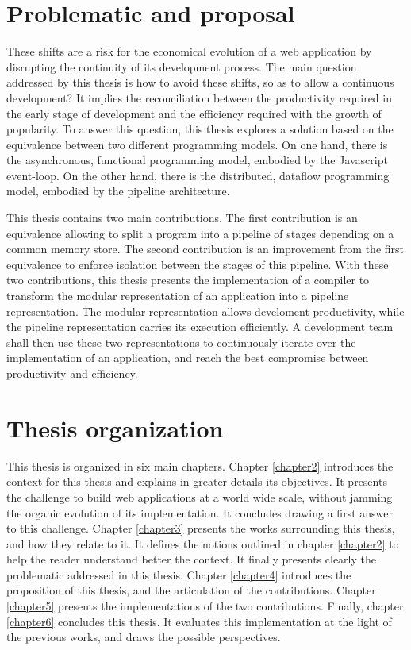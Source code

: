 \section{Problematic and proposal}

These shifts are a risk for the economical evolution of a web application by disrupting the continuity of its development process.
The main question addressed by this thesis is how to avoid these shifts, so as to allow a continuous development?
It implies the reconciliation between the productivity required in the early stage of development and the efficiency required with the growth of popularity.
To answer this question, this thesis explores a solution based on the equivalence between two different programming models.
On one hand, there is the asynchronous, functional programming model, embodied by the Javascript event-loop.
On the other hand, there is the distributed, dataflow programming model, embodied by the pipeline architecture.

This thesis contains two main contributions.
The first contribution is an equivalence allowing to split a program into a pipeline of stages depending on a common memory store.
The second contribution is an improvement from the first equivalence to enforce isolation between the stages of this pipeline.
With these two contributions, this thesis presents the implementation of a compiler to transform the modular representation of an application into a pipeline representation.
The modular representation allows develoment productivity, while the pipeline representation carries its execution efficiently.
A development team shall then use these two representations to continuously iterate over the implementation of an application, and reach the best compromise between productivity and efficiency.

\section{Thesis organization}

This thesis is organized in six main chapters.
Chapter \ref{chapter2} introduces the context for this thesis and explains in greater details its objectives.
It presents the challenge to build web applications at a world wide scale, without jamming the organic evolution of its implementation.
It concludes drawing a first answer to this challenge.
Chapter \ref{chapter3} presents the works surrounding this thesis, and how they relate to it.
It defines the notions outlined in chapter \ref{chapter2} to help the reader understand better the context.
It finally presents clearly the problematic addressed in this thesis.
Chapter \ref{chapter4} introduces the proposition of this thesis, and the articulation of the contributions.
Chapter \ref{chapter5} presents the implementations of the two contributions.
Finally, chapter \ref{chapter6} concludes this thesis.
It evaluates this implementation at the light of the previous works, and draws the possible perspectives.